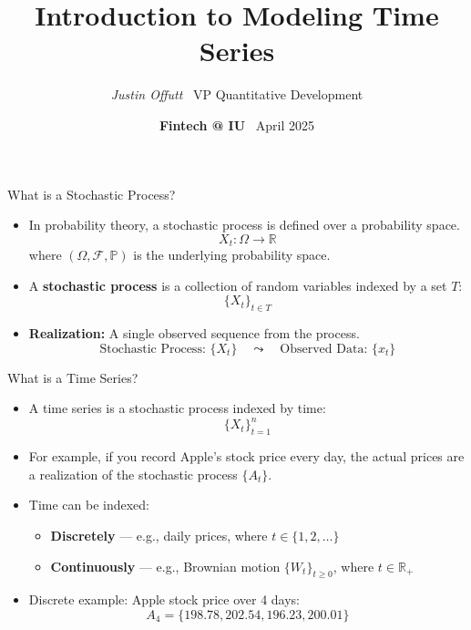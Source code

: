 \documentclass{beamer}
\title[Time Series Modeling]{\textbf{Introduction to Modeling Time Series}}
\author{\textit{Justin Offutt} \ VP Quantitative Development}
\date{\textbf{Fintech @ IU} \ April 2025}
\begin{document}
	\frame{\titlepage}

\begin{frame}{What is a Stochastic Process?}
	\begin{itemize}
		\item In probability theory, a stochastic process is defined over a probability space. 
		\[
		X_t : \Omega \to \mathbb{R}
		\]
		where \( (\Omega, \mathcal{F}, \mathbb{P}) \) is the underlying probability space.
		\item A \textbf{stochastic process} is a collection of random variables indexed by a set \( T \): 
		\[
		\{X_t\}_{t \in T}
		\]
		\item \textbf{Realization:} A single observed sequence from the process.
		\[
		\text{Stochastic Process: } \{X_t\} \quad \leadsto \quad \text{Observed Data: } \{x_t\}
		\]
	
	\end{itemize}
\end{frame}

	

\begin{frame}{What is a Time Series?}
	\begin{itemize}
		\item A time series is a stochastic process indexed by time:
		\[
		\{X_t\}_{t=1}^n
		\]
		\item For example, if you record Apple's stock price every day, the actual prices are a realization of the stochastic process \( \{A_t\} \).
		\item Time can be indexed:
		\begin{itemize}
			\item \textbf{Discretely} — e.g., daily prices, where \( t \in \{1, 2, \dots\} \)
			\item \textbf{Continuously} — e.g., Brownian motion \( \{W_t\}_{t \geq 0} \), where \( t \in \mathbb{R}_+ \)
		\end{itemize}
		\item Discrete example: Apple stock price over 4 days:
		\[
		A_4 = \{198.78, 202.54, 196.23, 200.01\}
		\]
	\end{itemize}
\end{frame}
\end{document}

